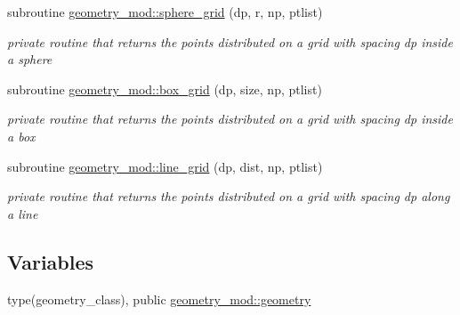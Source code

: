 \begin{DoxyCompactItemize}
subroutine \mbox{\hyperlink{namespacegeometry__mod_a6c03a4ea3de6763940396dbeb3908ebc}{geometry\+\_\+mod\+::sphere\+\_\+grid}} (dp, r, np, ptlist)
\begin{DoxyCompactList}\small\item\em private routine that returns the points distributed on a grid with spacing dp inside a sphere \end{DoxyCompactList}\item 
subroutine \mbox{\hyperlink{namespacegeometry__mod_ae87e4ecff2d21a839da2b82919b5fd0b}{geometry\+\_\+mod\+::box\+\_\+grid}} (dp, size, np, ptlist)
\begin{DoxyCompactList}\small\item\em private routine that returns the points distributed on a grid with spacing dp inside a box \end{DoxyCompactList}\item 
subroutine \mbox{\hyperlink{namespacegeometry__mod_abcb09c0f5274c27cb79b0dd009ed94b3}{geometry\+\_\+mod\+::line\+\_\+grid}} (dp, dist, np, ptlist)
\begin{DoxyCompactList}\small\item\em private routine that returns the points distributed on a grid with spacing dp along a line \end{DoxyCompactList}\end{DoxyCompactItemize}
\subsection*{Variables}
\begin{DoxyCompactItemize}
\item 
type(geometry\+\_\+class), public \mbox{\hyperlink{namespacegeometry__mod_ad2ad4f7e1138beaad5f37d5c15b7b457}{geometry\+\_\+mod\+::geometry}}
\end{DoxyCompactItemize}
